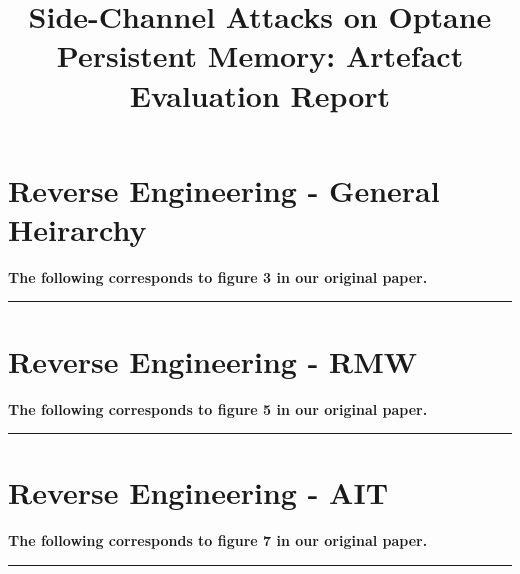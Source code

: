 \documentclass[letterpaper,twocolumn,10pt]{article}
\begin{document}
\title{Side-Channel Attacks on Optane Persistent Memory: Artefact Evaluation Report}

\maketitle

\newcommand{\corresponds}[1]{\textbf{The following corresponds to #1  in our original paper.}}

\begin{minipage}{\linewidth}
\section*{Reverse Engineering - General Heirarchy}
\corresponds{figure 3}
\begin{figure}[H]
\centering
{}
\label{fig:general_hierarchy}
\end{figure}
\hrule
\end{minipage}

\begin{minipage}{\linewidth}
\section*{Reverse Engineering - RMW }
\corresponds{figure 5}
\begin{figure}[H]
\centering
\begin{subfigure}[b]{0.49\hsize}

\end{subfigure}
\begin{subfigure}[b]{0.49\hsize}

\end{subfigure}
\label{fig:rmw_reverse}
\end{figure}
\hrule
\end{minipage}

%

\begin{minipage}{\linewidth}
\section*{Reverse Engineering - AIT}
\corresponds{figure 7}
\begin{figure}[H]
\centering
\begin{subfigure}[b]{0.52\hsize}
\adjustbox{}{}
\end{subfigure}
\begin{subfigure}[b]{0.45\hsize}
\adjustbox{}{}
\end{subfigure}
\label{fig:ait_reverse}
\end{figure}
\hrule
\end{minipage}
\end{document}
